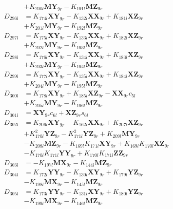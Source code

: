 \begin{multicols}{2}
\begin{align}
&+ K_{200l}\mathbf{MY}_{9r} - K_{191l}\mathbf{MZ}_{9r} \nonumber \\
D_{296l} &= K_{174l}\mathbf{XY}_{9r} - K_{132l}\mathbf{XX}_{9r} + K_{181l}\mathbf{XZ}_{9r}  \nonumber \\
&+ K_{201l}\mathbf{MY}_{9r} - K_{192l}\mathbf{MZ}_{9r} \nonumber \\
D_{297l} &= K_{175l}\mathbf{XY}_{9r} - K_{133l}\mathbf{XX}_{9r} + K_{182l}\mathbf{XZ}_{9r}  \nonumber \\
&+ K_{202l}\mathbf{MY}_{9r} - K_{193l}\mathbf{MZ}_{9r} \nonumber \\
D_{298l} &= K_{176l}\mathbf{XY}_{9r} - K_{134l}\mathbf{XX}_{9r} + K_{183l}\mathbf{XZ}_{9r}  \nonumber \\
&+ K_{203l}\mathbf{MY}_{9r} - K_{194l}\mathbf{MZ}_{9r} \nonumber \\
D_{299l} &= K_{177l}\mathbf{XY}_{9r} - K_{135l}\mathbf{XX}_{9r} + K_{184l}\mathbf{XZ}_{9r}  \nonumber \\
&+ K_{204l}\mathbf{MY}_{9r} - K_{195l}\mathbf{MZ}_{9r} \nonumber \\
D_{300l} &= K_{178l}\mathbf{XY}_{9r} + K_{185l}\mathbf{XZ}_{9r} - \mathbf{XX}_{9r}c_{5l}  \nonumber \\
&+ K_{205l}\mathbf{MY}_{9r} - K_{196l}\mathbf{MZ}_{9r} \nonumber \\
D_{301l} &= \mathbf{XY}_{9r}c_{6l} + \mathbf{XZ}_{9r}s_{6l} \nonumber \\
D_{302l} &= K_{206l}\mathbf{XY}_{9r} - K_{162l}\mathbf{XX}_{9r} + K_{207l}\mathbf{XZ}_{9r}  \nonumber \\
&+ K_{170l}^2\mathbf{YZ}_{9r} - K_{171l}^2\mathbf{YZ}_{9r} + K_{209l}\mathbf{MY}_{9r}  \nonumber \\
&- K_{208l}\mathbf{MZ}_{9r} - K_{169l}K_{171l}\mathbf{XY}_{9r} + K_{169l}K_{170l}\mathbf{XZ}_{9r}  \nonumber \\
&- K_{170l}K_{171l}\mathbf{YY}_{9r} + K_{170l}K_{171l}\mathbf{ZZ}_{9r} \nonumber \\
D_{303l} &= - K_{197l}\mathbf{MX}_{9r} - K_{144l}\mathbf{MZ}_{9r} \nonumber \\
D_{304l} &= K_{172l}\mathbf{YY}_{9r} - K_{130l}\mathbf{XY}_{9r} + K_{179l}\mathbf{YZ}_{9r}  \nonumber \\
&- K_{198l}\mathbf{MX}_{9r} - K_{145l}\mathbf{MZ}_{9r} \nonumber \\
D_{305l} &= K_{173l}\mathbf{YY}_{9r} - K_{131l}\mathbf{XY}_{9r} + K_{180l}\mathbf{YZ}_{9r}  \nonumber \\
&- K_{199l}\mathbf{MX}_{9r} - K_{146l}\mathbf{MZ}_{9r} \nonumber \\

\end{align}
\end{multicols}
